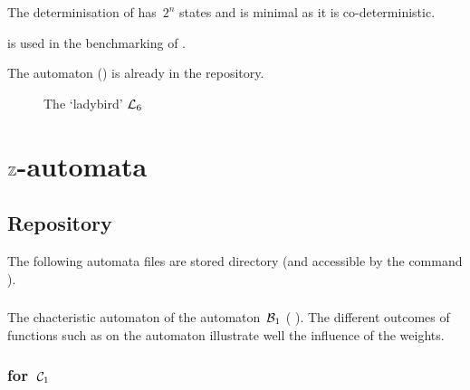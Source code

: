 \Comt
The determinisation of  has~$2^{n}$ states and is
minimal as it is co-deterministic.

 is used in the benchmarking of \vcsn.

The automaton  () is already in the
repository.

\begin{figure}[ht]
    \centering
\caption{The `ladybird' $\mathcal{L}_{6}$}
\label{fig:ldb-6}
\end{figure}



\section{$\mathbb{Z}$-automata}

\subsection{Repository}

The following automata files are stored
 directory (and accessible by the command
).

\subsubsection{}

The chacteristic automaton of the automaton~$\mathcal{B}_1$ (\cf
{}).
The different outcomes of functions such as
 on the automaton
 illustrate well the influence of the weights.

\subsubsection{ for~$\mathcal{C}_1$ }

